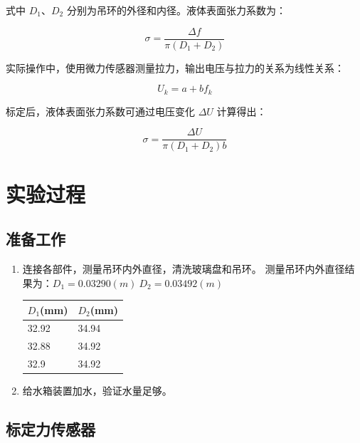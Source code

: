\documentclass[UTF8]{ctexart}
\begin{document}
式中 \(D_1\)、\(D_2\) 分别为吊环的外径和内径。液体表面张力系数为：

\begin{equation}
\sigma = \frac{\Delta f}{\pi (D_1 + D_2)}
\end{equation}

实际操作中，使用微力传感器测量拉力，输出电压与拉力的关系为线性关系：

\begin{equation}
U_k = a + b f_k
\end{equation}

标定后，液体表面张力系数可通过电压变化 \(\Delta U\) 计算得出：

\begin{equation}
\sigma = \frac{\Delta U}{\pi (D_1 + D_2) b}
\end{equation}

\section{实验过程}

\subsection{准备工作}

\begin{enumerate}
    \item 连接各部件，测量吊环内外直径，清洗玻璃盘和吊环。
    测量吊环内外直径结果为：$D_1 = 0.03290(m) \ D_2 = 0.03492(m)$
    \begin{table}
        \centering
        \begin{tabular}{ll}
        \toprule
        $D_1$(mm)&$D_2$(mm)\\
        \midrule
        32.92&34.94\\
        32.88&34.92\\
        32.9&34.92\\
        \bottomrule
    \end{tabular}
    \end{table}

    \item 给水箱装置加水，验证水量足够。
\end{enumerate}

\subsection{标定力传感器}
\end{document}
